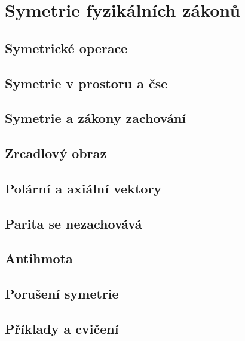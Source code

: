\chapter{Symetrie fyzikálních zákonů}\label{fyz:IchapLII}
\minitoc
  \section{Symetrické operace}\label{fyz:IchapLIIsecI}
  \section{Symetrie v prostoru a čse}\label{fyz:IchapLIIsecII}
  \section{Symetrie a zákony zachování}\label{fyz:IchapLIIsecIII}
  \section{Zrcadlový obraz}\label{fyz:IchapLIIsecIV}
  \section{Polární a axiální vektory}\label{fyz:IchapLIIsecV}
  \section{Parita se nezachovává}\label{fyz:IchapLIIsecVI}
  \section{Antihmota}\label{fyz:IchapLIIsecVII}
  \section{Porušení symetrie}\label{fyz:IchapLIIsecVIII}
  \section{Příklady a cvičení}\label{fyz:IchapLIIsecIX}